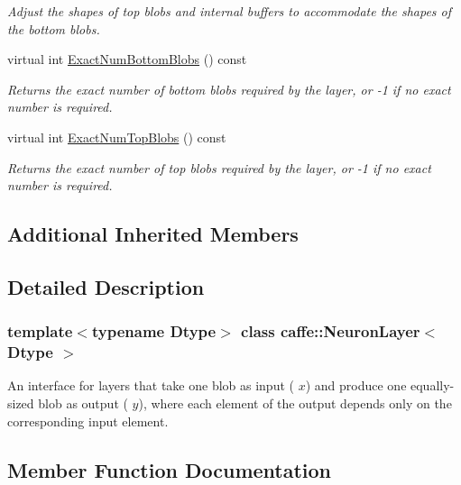 \begin{DoxyCompactItemize}
\begin{DoxyCompactList}\small\item\em Adjust the shapes of top blobs and internal buffers to accommodate the shapes of the bottom blobs. \end{DoxyCompactList}\item 
virtual int \mbox{\hyperlink{classcaffe_1_1_neuron_layer_abb6c0e6acd2863baf47d6e6acda6f55f}{Exact\+Num\+Bottom\+Blobs}} () const
\begin{DoxyCompactList}\small\item\em Returns the exact number of bottom blobs required by the layer, or -\/1 if no exact number is required. \end{DoxyCompactList}\item 
virtual int \mbox{\hyperlink{classcaffe_1_1_neuron_layer_a47ac5e7208e4b14ad1e4040a621dbfbc}{Exact\+Num\+Top\+Blobs}} () const
\begin{DoxyCompactList}\small\item\em Returns the exact number of top blobs required by the layer, or -\/1 if no exact number is required. \end{DoxyCompactList}\end{DoxyCompactItemize}
\subsection*{Additional Inherited Members}


\subsection{Detailed Description}
\subsubsection*{template$<$typename Dtype$>$\newline
class caffe\+::\+Neuron\+Layer$<$ Dtype $>$}

An interface for layers that take one blob as input ( $ x $) and produce one equally-\/sized blob as output ( $ y $), where each element of the output depends only on the corresponding input element. 

\subsection{Member Function Documentation}
\mbox{\label{classcaffe_1_1_neuron_layer_abb6c0e6acd2863baf47d6e6acda6f55f}} 

